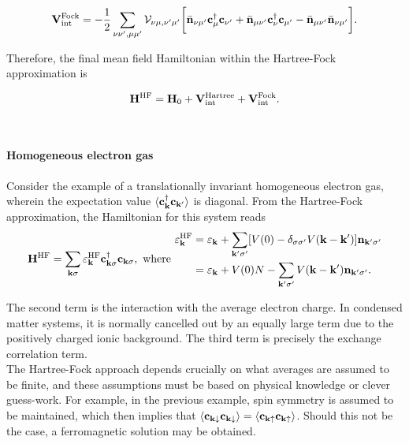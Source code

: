 \documentclass{homework}
\begin{document}
\begin{equation}
    {\bf V}_{\textnormal{int}}^{\textnormal{Fock}} = - \frac{1}{2} \sum_{\nu\nu', \mu\mu'} {\mathcal V}_{\nu\mu, \nu'\mu'} \bigg[ \bar{\bf n}_{\nu \mu'} {\bf c}_{\mu}^\dagger {\bf c}_{\nu'} + \bar{\bf n}_{\mu \nu'} {\bf c}_{\nu}^\dagger {\bf c}_{\mu'} - \bar{\bf n}_{\mu \nu'} \bar{\bf n}_{\nu \mu'}\bigg].
\end{equation}

Therefore, the final mean field Hamiltonian within the Hartree-Fock approximation is 

\begin{equation}
    {\bf H}^{\textnormal{HF}} = {\bf H}_0 + {\bf V}_{\textnormal{int}}^{\textnormal{Hartree}} + {\bf V}_{\textnormal{int}}^{\textnormal{Fock}}.
\end{equation}

\blanky \\

\paragraph{\textbf{Homogeneous electron gas}}

Consider the example of a translationally invariant homogeneous electron gas, wherein the expectation value $\langle {\bf c}_{\bf k}^\dagger {\bf c}_{\bf k'} \rangle$ is diagonal. From the Hartree-Fock approximation, the Hamiltonian for this system reads 
\begin{align}
    {\bf H}^{\textnormal{HF}} = \sum_{{\bf k} \sigma} \varepsilon_{\bf k}^{\textnormal{HF}} {\bf c}_{{\bf k} \sigma}^\dagger {\bf c}_{{\bf k} \sigma}, \textnormal{ where } \begin{split}
        \varepsilon_{\bf k}^{\textnormal{HF}} &= \varepsilon_{\bf k} + \sum_{{\bf k}' \sigma'} [V(0) - \delta_{\sigma\sigma'} V({\bf k}- {\bf k}')] {\bf n}_{{\bf k}' \sigma'} \\
        &= \varepsilon_{\bf k} + V(0) N - \sum_{{\bf k}' \sigma'} V({\bf k}- {\bf k}') {\bf n}_{{\bf k'} \sigma'}.
    \end{split}
\end{align}

The second term is the interaction with the average electron charge. In condensed matter systems, it is normally cancelled out by an equally large term due to the positively charged ionic background. The third term is precisely the exchange correlation term. \\

The Hartree-Fock approach depends crucially on what averages are assumed to be finite, and these assumptions must be based on physical knowledge or clever guess-work. For example, in the previous example, spin symmetry is assumed to be maintained, which then implies that $\langle {\bf c}_{{\bf k} \downarrow} {\bf c}_{{\bf k}\downarrow} \rangle = \langle {\bf c}_{{\bf k} \uparrow} {\bf c}_{{\bf k}\uparrow} \rangle$. Should this not be the case, a ferromagnetic solution may be obtained. \\
\end{document}
